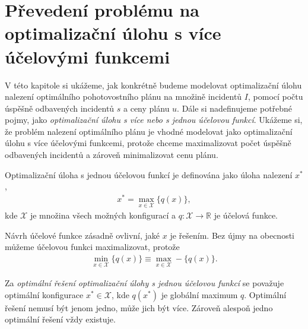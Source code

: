 \section{Převedení problému na optimalizační úlohu s více účelovými funkcemi}\label{kap:optUloha2uc}

V této kapitole si ukážeme, jak konkrétně budeme modelovat optimalizační úlohu nalezení optimálního pohotovostního plánu na množině incidentů $I$,
pomocí počtu úspěšně odbavených incidentů $s$ a ceny plánu $u$.
Dále si nadefinujeme potřebné pojmy, jako \textit{optimalizační úlohu s více nebo s jednou účelovou funkcí}.
Ukážeme si, že problém nalezení optimálního plánu je vhodné modelovat jako optimalizační úlohu s více účelovými funkcemi,
protože chceme maximalizovat počet úspěšně odbavených incidentů a zároveň minimalizovat cenu plánu.

\begin{definice}\label{df:optUloha1ucObecne}
  Optimalizační úloha s jednou účelovou funkcí je definována jako úloha nalezení $x^*$,
  \begin{align}
    x^* = \max_{x \in \mathcal{X}} \{ q(x) \},
  \end{align}
  kde $\mathcal{X}$ je množina všech možných konfigurací a $q \colon \mathcal{X} \rightarrow \mathbb{R}$ je účelová funkce.
\end{definice}

Návrh účelové funkce zásadně ovlivní, jaké $x$ je řešením.
Bez újmy na obecnosti můžeme účelovou funkci maximalizovat, protože
\begin{align*}
  \min_{x \in \mathcal{X}} \{ q(x) \} \equiv \max_{x \in \mathcal{X}} - \{ q(x) \}.
\end{align*}

Za \textit{optimální řešení optimalizační úlohy s jednou účelovou funkcí} se považuje optimální konfigurace $x^* \in \mathcal{X}$,
kde $q(x^*)$ je globální maximum $q$.
Optimální řešení nemusí být jenom jedno, může jich být více. Zároveň alespoň jedno optimální řešení vždy existuje.

